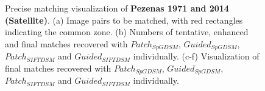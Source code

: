 \begin{figure}[htbp]
\begin{center}
{\begin{minipage}[t]{0.48\linewidth}
			\end{minipage}%
		}
		\caption{Precise matching visualization of \textbf{Pezenas 1971 and 2014 (Satellite)}. (a) Image pairs to be matched, with red rectangles indicating the common zone. (b) Numbers of tentative, enhanced and final matches recovered with $Patch_{SpGDSM}$, $Guided_{SpGDSM}$, $Patch_{SIFTDSM}$ and $Guided_{SIFTDSM}$ individually. (c-f) Visualization of final matches recovered with $Patch_{SpGDSM}$, $Guided_{SpGDSM}$, $Patch_{SIFTDSM}$ and $Guided_{SIFTDSM}$ individually.}
		\label{MatchVizPezenas}
	\end{center}
\end{figure} 


